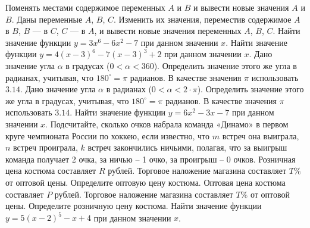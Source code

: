 Поменять местами содержимое переменных $A$ и $B$ и вывести новые значения $A$ и $B$.
Даны переменные $A$, $B$, $C$. Изменить их значения, переместив содержимое $A$ в $B$, $B$ --- в $C$, $C$ --- в $A$, и вывести новые значения переменных $A$, $B$, $C$.
Найти значение функции $y = 3x^6 - 6x^2 - 7$ при данном значении $x$.
Найти значение функции $y = 4(x - 3)^6 - 7(x - 3)^3 + 2$ при данном значении $x$.
Дано значение угла $\alpha$ в градусах ($0 < \alpha < 360$). Определить значение этого же угла в радианах, учитывая, что $180^\circ = \pi$ радианов. В качестве значения $\pi$ использовать $3.14$.
Дано значение угла $\alpha$ в радианах ($0 < \alpha < 2 \cdot \pi$). Определить значение этого же угла в градусах, учитывая, что $180^\circ = \pi$ радианов. В качестве значения $\pi$ использовать $3.14$.
Найти значение функции $y = 6x^2 - 3x - 7$ при данном значении $x$.
Подсчитайте, сколько очков набрала команда «Динамо» в первом круге чемпионата России по хоккею, если известно, что $m$ встреч она выиграла, $n$ встреч проиграла, $k$ встреч закончились ничьими, полагая, что за выигрыш команда получает 2 очка, за ничью -- 1 очко, за проигрыш -- 0 очков.
Розничная цена костюма составляет $R$ рублей. Торговое наложение магазина составляет $T\%$ от оптовой цены. Определите оптовую цену костюма.
Оптовая цена костюма составляет $P$ рублей. Торговое наложение магазина составляет $T\%$ от оптовой цены. Определите розничную цену костюма.
Найти значение функции $y = 5(x - 2)^5 - x + 4$ при данном значении $x$.
